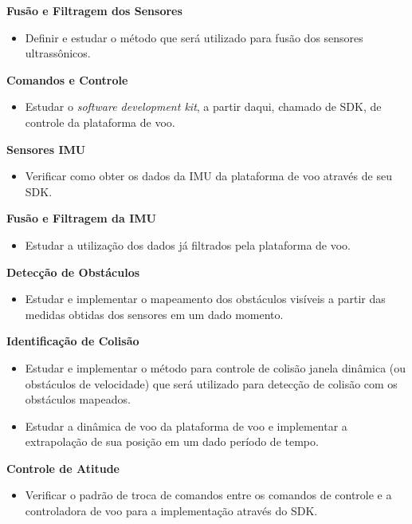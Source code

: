 \documentclass[a4paper, 12pt]{article}
\begin{document}
\noindent\textbf{Fusão e Filtragem dos Sensores} 
\begin{itemize}
	\item
	Definir e estudar o método que será utilizado para fusão dos sensores ultrassônicos.
\end{itemize}

\noindent\textbf{Comandos e Controle} 
\begin{itemize}
	\item
	Estudar o \textit{software development kit}, a partir daqui, chamado de SDK, de controle da plataforma de voo.  
\end{itemize}

\noindent\textbf{Sensores IMU} 
\begin{itemize}
	\item
	Verificar como obter os dados da IMU da plataforma de voo através de seu SDK.
\end{itemize}

\noindent\textbf{Fusão e Filtragem da IMU} 
\begin{itemize}
	\item
	Estudar a utilização dos dados já filtrados pela plataforma de voo.  
\end{itemize}

\noindent\textbf{Detecção de Obstáculos} 
\begin{itemize}
	\item
	Estudar e implementar o mapeamento dos obstáculos visíveis a partir das medidas obtidas dos sensores em um dado momento.  
\end{itemize}

\noindent\textbf{Identificação de Colisão} 
\begin{itemize}
	\item
	Estudar e implementar o método para controle de colisão janela dinâmica (ou obstáculos de velocidade) que será utilizado para detecção de colisão com os obstáculos mapeados. 
	\item
	Estudar a dinâmica de voo da plataforma de voo e implementar a extrapolação de sua posição em um dado período de tempo.  
\end{itemize}

\noindent\textbf{Controle de Atitude} 
\begin{itemize}
	\item
	Verificar o padrão de troca de comandos entre os comandos de controle e a controladora de voo para a implementação através do SDK.  
\end{itemize}
\end{document}
